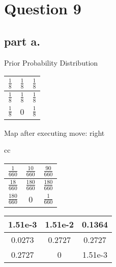 \section{Question 9}

\subsection{part a.}

Prior Probability Distribution
\begin{center}
\begin{tabular}{ |c|c|c| }
 \hline
 $ \frac{1}{8} $ &  $ \frac{1}{8}$ &  $\frac{1}{8} $\\
 \hline
  $\frac{1}{8}$ &  $\frac{1}{8}$   &  $\frac{1}{8}$ \\
 \hline
  $\frac{1}{8}$ &  0               &  $\frac{1}{8} $\\
 \hline
\end{tabular}
\end{center}

\noindent
Map after executing move: right \\
\begin{center}
\begin{tabular}{cc}%
\begin{tabular}[t]{ |c|c|c| }
 \hline
 $ \frac{1}{660} $ &  $ \frac{10}{660}$   &  $\frac{90}{660} $\\
 \hline
  $\frac{18}{660}$ &  $\frac{180}{660}$   &  $\frac{180}{660}$ \\
 \hline
  $\frac{180}{660}$  &  0                  &  $\frac{1}{660} $\\
 \hline
\end{tabular}

\begin{tabular}[t]{ |c|c|c| }
 \hline
  1.51e-3  &  1.51e-2   &  0.1364 \\
 \hline
  0.0273   &  0.2727   &  0.2727 \\
 \hline
  0.2727   &  0        & 1.51e-3  \\
 \hline
\end{tabular}
\end{tabular}
\end{center}


